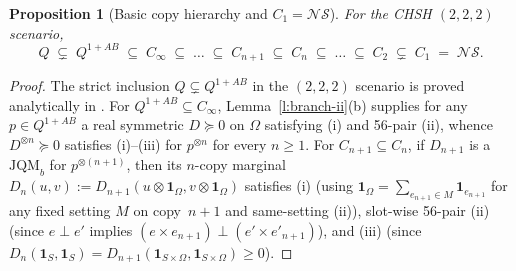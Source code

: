 \documentclass[11pt,a4paper]{article}
\newtheorem{proposition}[theorem]{Proposition}
\theoremstyle{definition}
\theoremstyle{remark}
\newcommand{\ind}[1]{\mathbf{1}_{#1}}
\newcommand{\JQMb}{\mathrm{JQM}_b}
\newcommand{\QAB}{Q^{1+AB}}
\newcommand{\NS}{\mathcal{NS}}
\begin{document}
\begin{proposition}[Basic copy hierarchy and $C_1 = \NS$]\label{p:hierarchy-basic}
For the CHSH $(2,2,2)$ scenario,
\[
  Q \;\subsetneq\; \QAB \;\subseteq\; C_\infty \;\subseteq\; \dots \;\subseteq\; C_{n+1} \;\subseteq\; C_n \;\subseteq\; \dots \;\subseteq\; C_2 \;\subsetneq\; C_1 \;=\; \NS.
\]
\end{proposition}

\begin{proof}
The strict inclusion $Q \subsetneq \QAB$ in the $(2,2,2)$ scenario is proved analytically in \cite[Sec.~3]{NGHA}. For $\QAB \subseteq C_\infty$, Lemma~\ref{l:branch-ii}(b) supplies for any $p \in \QAB$ a real symmetric $D \succeq 0$ on $\Omega$ satisfying (i) and 56-pair (ii), whence $D^{\otimes n} \succeq 0$ satisfies (i)--(iii) for $p^{\otimes n}$ for every $n \ge 1$. For $C_{n+1} \subseteq C_n$, if $D_{n+1}$ is a $\JQMb$ for $p^{\otimes(n+1)}$, then its $n$-copy marginal $D_n(u, v) := D_{n+1}(u \otimes \ind\Omega, v \otimes \ind\Omega)$ satisfies (i) (using $\ind\Omega = \sum_{e_{n+1} \in M} \ind{e_{n+1}}$ for any fixed setting $M$ on copy~$n+1$ and same-setting (ii)), slot-wise 56-pair (ii) (since $e \perp e'$ implies $(e \times e_{n+1}) \perp (e' \times e'_{n+1})$), and (iii) (since $D_n(\ind S, \ind S) = D_{n+1}(\ind{S \times \Omega}, \ind{S \times \Omega}) \ge 0$).


\end{proof}
\end{document}
